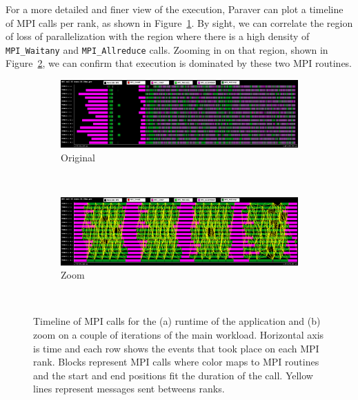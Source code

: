 \documentclass{juliacon}
\begin{document}
For a more detailed and finer view of the execution, Paraver can plot a timeline of MPI calls per rank, as shown in Figure~\ref{fig:timeline:orig}. By sight, we can correlate the region of loss of parallelization with the region where there is a high density of \texttt{MPI\_Waitany} and \texttt{MPI\_Allreduce} calls. Zooming in on that region, shown in Figure~\ref{fig:timeline:zoom}, we can confirm that execution is dominated by these two MPI routines.

\begin{figure}[h]
    \centering
    \begin{subfigure}{\linewidth}
        \includegraphics[width=\linewidth]{MPI_call-trace-16-10ms.png}
        \caption{Original}
        \label{fig:timeline:orig}
    \end{subfigure}
    \\\vspace{1em}
    \begin{subfigure}{\linewidth}
        \includegraphics[width=\linewidth]{MPI_call-trace-16-10ms-zoom.png}
        \caption{Zoom}
        \label{fig:timeline:zoom}
    \end{subfigure}
    \\\vspace{1em}
    \caption{Timeline of MPI calls for the (a) runtime of the application and (b) zoom on 
 a couple of iterations of the main workload. Horizontal axis is time and each row shows the events that took place on each MPI rank. Blocks represent MPI calls where color maps to MPI routines and the start and end positions fit the duration of the call. Yellow lines represent messages sent betweens ranks.}
    \label{fig:timeline}
\end{figure}
\end{document}
